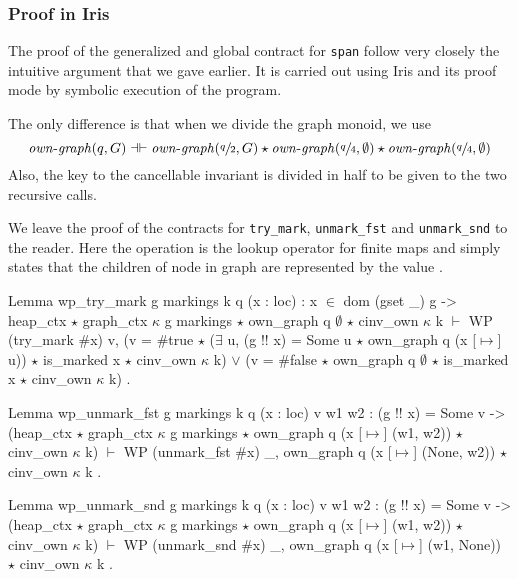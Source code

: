 \documentclass[]{scrartcl}
\def\MyMLe{\lstinline[language=MyML, basicstyle=\small\ttfamily, mathescape=true]}
\newcommand{\localgr}{\mathit{own\text{-}graph}}
\begin{document}
\subsubsection{Proof in Iris}
The proof of the generalized and global contract for
\MyMLe{span} follow very closely the intuitive argument that we gave earlier.
It is carried out using Iris and its proof mode
by symbolic execution of the program.

The only difference is that when we divide the
graph monoid, we use
\[
\localgr(q, G) \dashv\vdash \localgr(\sfrac{q}{2}, G) \star \localgr(\sfrac{q}{4},\emptyset) \star \localgr(\sfrac{q}{4},\emptyset)
\]
Also, the key to the cancellable invariant is divided in half
to be given to the two recursive calls.

We leave the proof of the contracts for
\MyMLe{try_mark},
\MyMLe{unmark_fst} and \MyMLe{unmark_snd}
to the reader.
Here the operation \Coqe{!!} is the lookup operator for
finite maps and 
simply states that the children of node  in graph  are
represented by the value .
\begin{Coq}
Lemma wp_try_mark g markings k q (x : loc) : x $\in$ dom (gset _) g ->
    heap_ctx $\star$ graph_ctx $\kappa$ g markings $\star$ own_graph q $\emptyset$
     $\star$ cinv_own $\kappa$ k
    $\vdash$ WP (try_mark $\#$x) {{ v,
         (v = $\#$true $\star$ ($\exists$ u, (g !! x) = Some u $\star$ own_graph q (x [$\mapsto$] u))
          $\star$ is_marked x $\star$ cinv_own $\kappa$ k)
           $\lor$ (v = $\#$false $\star$ own_graph q $\emptyset$ $\star$ is_marked x
              $\star$ cinv_own $\kappa$ k) }}.
\end{Coq}

\begin{Coq}
Lemma wp_unmark_fst g markings k q (x : loc) v w1 w2 :
    (g !! x) = Some v ->
    (heap_ctx $\star$ graph_ctx $\kappa$ g markings
     $\star$ own_graph q (x [$\mapsto$] (w1, w2)) $\star$ cinv_own $\kappa$ k) $\vdash$
      WP (unmark_fst $\#$x)
      {{ _, own_graph q (x [$\mapsto$] (None, w2)) $\star$ cinv_own $\kappa$ k }}.
\end{Coq}

\begin{Coq}
Lemma wp_unmark_snd g markings k q (x : loc) v w1 w2 :
    (g !! x) = Some v ->
    (heap_ctx $\star$ graph_ctx $\kappa$ g markings
    $\star$ own_graph q (x [$\mapsto$] (w1, w2)) $\star$ cinv_own $\kappa$ k) $\vdash$
      WP (unmark_snd $\#$x)
      {{ _, own_graph q (x [$\mapsto$] (w1, None)) $\star$ cinv_own $\kappa$ k }}.
\end{Coq}
\end{document}
